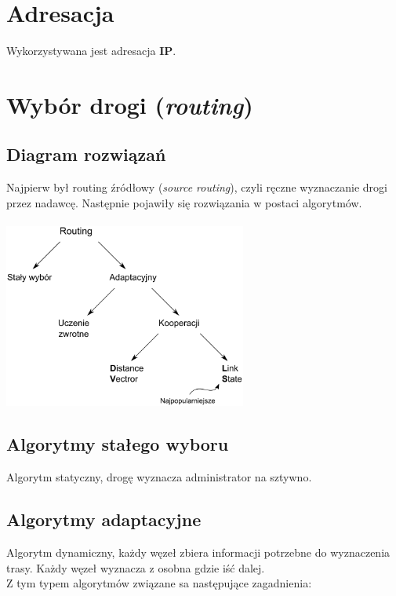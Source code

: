 \documentclass[a4paper,twoside]{article}
\begin{document}
	\section{Adresacja}
		Wykorzystywana jest adresacja \textbf{IP}.
	\section{Wybór drogi (\emph{routing})}
		\subsection{Diagram rozwiązań}
			Najpierw był routing źródłowy (\emph{source routing}), czyli ręczne wyznaczanie drogi przez nadawcę. Następnie pojawiły się rozwiązania w postaci algorytmów.\\\\
			\includegraphics[width=8cm]{./images/image35.pdf}
		\subsection{Algorytmy stałego wyboru}
			Algorytm statyczny, drogę wyznacza administrator na sztywno.
		\subsection{Algorytmy adaptacyjne}
			Algorytm dynamiczny, każdy węzeł zbiera informacji potrzebne do wyznaczenia trasy. Każdy węzeł wyznacza z osobna gdzie iść dalej.\\
			Z tym typem algorytmów związane sa następujące zagadnienia:
\end{document}

